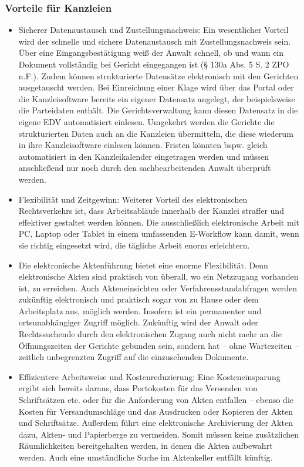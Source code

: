 \subsubsection{Vorteile für Kanzleien}
\begin{itemize}
\item Sicherer Datenaustausch und Zustellungsnachweis: Ein wesentlicher Vorteil wird der schnelle und sichere Datenaustausch mit Zustellungsnachweis sein. Über eine Eingangsbestätigung weiß der Anwalt schnell, ob und wann ein Dokument vollständig bei Gericht eingegangen ist (§ 130a Abs. 5 S. 2 ZPO n.F.). Zudem können strukturierte Datensätze elektronisch mit den Gerichten ausgetauscht werden. Bei Einreichung einer Klage wird über das Portal oder die Kanzleisoftware bereits ein eigener Datensatz angelegt, der beispielsweise die Parteidaten enthält. Die Gerichtsverwaltung kann diesen Datensatz in die eigene EDV automatisiert einlesen. Umgekehrt werden die Gerichte die strukturierten Daten auch an die Kanzleien übermitteln, die diese wiederum in ihre Kanzleisoftware einlesen können. Fristen könnten bspw. gleich automatisiert in den Kanzleikalender eingetragen werden und müssen anschließend nur noch durch den sachbearbeitenden Anwalt überprüft werden.
\item Flexibilität und Zeitgewinn: Weiterer Vorteil des elektronischen Rechtsverkehrs ist, dass Arbeitsabläufe innerhalb der Kanzlei straffer und effektiver gestaltet werden können. Die ausschließlich elektronische Arbeit mit PC, Laptop oder Tablet in einem umfassenden E-Workflow kann damit, wenn sie richtig eingesetzt wird, die tägliche Arbeit enorm erleichtern.
\item Die elektronische Aktenführung bietet eine enorme Flexibilität. Denn elektronische Akten sind praktisch von überall, wo ein Netzzugang vorhanden ist, zu erreichen. Auch Akteneinsichten oder Verfahrensstandabfragen werden zukünftig elektronisch und praktisch sogar von zu Hause oder dem Arbeitsplatz aus, möglich werden. Insofern ist ein permanenter und ortsunabhängiger Zugriff möglich. Zukünftig wird der Anwalt oder Rechtssuchende durch den elektronischen Zugang auch nicht mehr an die Öffnungszeiten der Gerichte gebunden sein, sondern hat – ohne Wartezeiten –  zeitlich unbegrenzten Zugriff auf die einzusehenden Dokumente.
\item Effizientere Arbeitsweise und Kostenreduzierung: Eine Kosteneinsparung ergibt sich bereits daraus, dass Portokosten für das Versenden von Schriftsätzen etc. oder für die Anforderung von Akten entfallen – ebenso die Kosten für Versandumschläge und das Ausdrucken oder Kopieren der Akten und Schriftsätze. Außerdem führt eine elektronische Archivierung der Akten dazu, Akten- und Papierberge zu vermeiden. Somit müssen keine zusätzlichen Räumlichkeiten bereitgehalten werden, in denen die Akten aufbewahrt werden. Auch eine umständliche Suche im Aktenkeller entfällt künftig.

\end{itemize}
